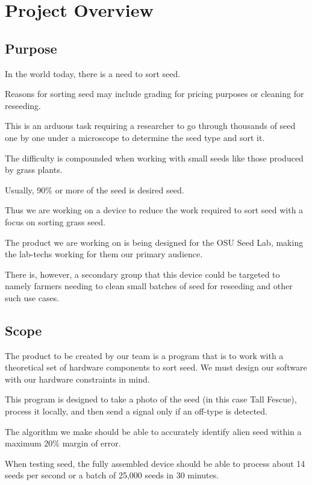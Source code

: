 \documentclass[onecolumn, draftclsnofoot,10pt, compsoc]{IEEEtran}
\begin{document}
	
	\section{Project Overview}
	
	\subsection{Purpose}
	
	In the world today, there is a need to sort seed.
	
	Reasons for sorting seed may include grading for pricing purposes or cleaning for reseeding. 
	
	This is an arduous task requiring a researcher to go through thousands of seed one by one under a microscope to determine the seed type and sort it.
	
	The difficulty is compounded when working with small seeds like those produced by grass plants.
	
	Usually, 90\% or more of the seed is desired seed.
	
	Thus we are working on a device to reduce the work required to sort seed with a focus on sorting grass seed.
	
	The product we are working on is being designed for the OSU Seed Lab, making the lab-techs working for them our primary audience.
	
	There is, however, a secondary group that this device could be targeted to namely farmers needing to clean small batches of seed for reseeding and other such use cases.
	
	
	
	\subsection{Scope}
	
	The product to be created by our team is a program that is to work with a theoretical set of hardware components to sort seed. We must design our software with our hardware constraints in mind. 
	
	This program is designed to take a photo of the seed (in this case Tall Fescue), process it locally, and then send a signal only if an off-type is detected.
	
	The algorithm we make should be able to accurately identify alien seed within a maximum 20\% margin of error.
	
	When testing seed, the fully assembled device should be able to process about 14 seeds per second or a batch of 25,000 seeds in 30 minutes. 
	
\end{document}
